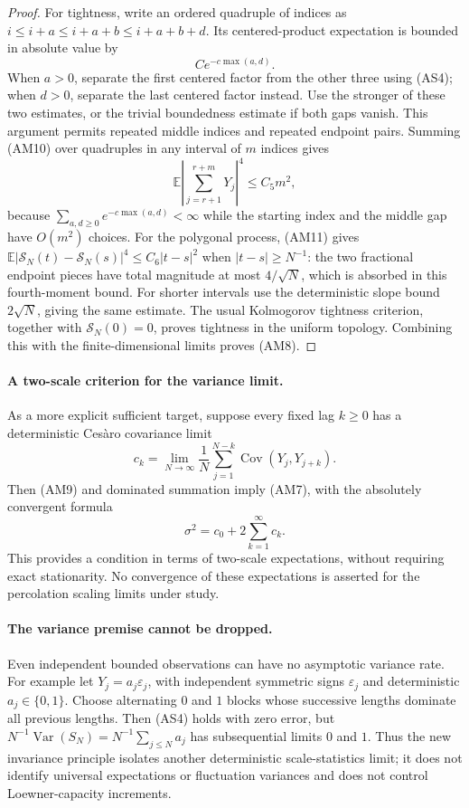 \documentclass[11pt]{article}
\theoremstyle{definition}\newtheorem{definition}[theorem]{Definition}
\theoremstyle{remark}\newtheorem{remark}[theorem]{Remark}
\begin{document}
\begin{proof}
For tightness, write an ordered quadruple of indices as
$i\le i+a\le i+a+b\le i+a+b+d$. Its centered-product expectation is
bounded in absolute value by
\[
 C e^{-c\max(a,d)}.
 \tag{AM10}
\]
When $a>0$, separate the first centered factor from the other three
using (AS4); when $d>0$, separate the last centered factor instead.
Use the stronger of these two estimates, or the trivial boundedness
estimate if both gaps vanish. This argument permits repeated middle
indices and repeated endpoint pairs. Summing (AM10) over quadruples
in any interval of $m$ indices gives
\[
 \mathbb E\left|\sum_{j=r+1}^{r+m}Y_j\right|^4\le C_5m^2,
 \tag{AM11}
\]
because $\sum_{a,d\ge0}e^{-c\max(a,d)}<\infty$ while the starting
index and the middle gap have $O(m^2)$ choices. For the polygonal
process, (AM11) gives
$\mathbb E|\mathcal S_N(t)-\mathcal S_N(s)|^4\le C_6|t-s|^2$
when $|t-s|\ge N^{-1}$: the two fractional endpoint pieces have
total magnitude at most $4/\sqrt N$, which is absorbed in this
fourth-moment bound. For shorter intervals use the deterministic
slope bound $2\sqrt N$, giving the same estimate. The usual
Kolmogorov tightness criterion, together with $\mathcal S_N(0)=0$,
proves tightness in the uniform topology. Combining this with the
finite-dimensional limits proves (AM8).
\end{proof}

\paragraph{A two-scale criterion for the variance limit.}
As a more explicit sufficient target, suppose every fixed lag $k\ge0$
has a deterministic Ces\`aro covariance limit
\[
 c_k=\lim_{N\to\infty}\frac1N
          \sum_{j=1}^{N-k}\operatorname{Cov}(Y_j,Y_{j+k}).
\]
Then (AM9) and dominated summation imply (AM7), with the absolutely
convergent formula
\[
 \sigma^2=c_0+2\sum_{k=1}^{\infty}c_k.
 \tag{AM12}
\]
This provides a condition in terms of two-scale expectations, without
requiring exact stationarity. No convergence of these expectations is
asserted for the percolation scaling limits under study.

\paragraph{The variance premise cannot be dropped.}
Even independent bounded observations can have no asymptotic variance
rate. For example let $Y_j=a_j\varepsilon_j$, with independent symmetric
signs $\varepsilon_j$ and deterministic $a_j\in\{0,1\}$. Choose
alternating $0$ and $1$ blocks whose successive lengths dominate all
previous lengths. Then (AS4) holds with zero error, but
$N^{-1}\operatorname{Var}(S_N)=N^{-1}\sum_{j\le N}a_j$ has subsequential
limits $0$ and $1$. Thus the new invariance principle isolates another
deterministic scale-statistics limit; it does not identify universal
expectations or fluctuation variances and does not control Loewner-capacity
increments.
\end{document}
